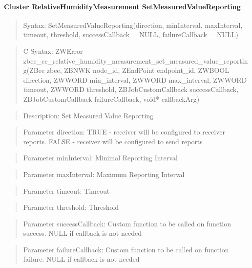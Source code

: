 \paragraph{Cluster RelativeHumidityMeasurement SetMeasuredValueReporting}
\begin{quote}Syntax: SetMeasuredValueReporting(direction, minInterval, maxInterval, timeout, threshold, successCallback = NULL, failureCallback = NULL)\end{quote}
\begin{quote}C Syntax: ZWError zbee\_cc\_relative\_humidity\_measurement\_set\_measured\_value\_reporting(ZBee zbee, ZBNWK node\_id, ZEndPoint endpoint\_id, ZWBOOL direction, ZWWORD min\_interval, ZWWORD max\_interval, ZWWORD timeout, ZWWORD threshold, ZBJobCustomCallback successCallback, ZBJobCustomCallback failureCallback, void* callbackArg)\end{quote}
\begin{quote}Description: Set Measured Value Reporting\end{quote}
\begin{quote}Parameter direction: TRUE  - receiver will be configured to receiver reports. FALSE - receiver will be configured to send reports\end{quote}
\begin{quote}Parameter minInterval: Minimal Reporting Interval\end{quote}
\begin{quote}Parameter maxInterval: Maximum Reporting Interval\end{quote}
\begin{quote}Parameter timeout: Timeout\end{quote}
\begin{quote}Parameter threshold: Threshold\end{quote}
\begin{quote}Parameter successCallback: Custom function to be called on function success. NULL if callback is not needed\end{quote}
\begin{quote}Parameter failureCallback: Custom function to be called on function failure. NULL if callback is not needed\end{quote}


